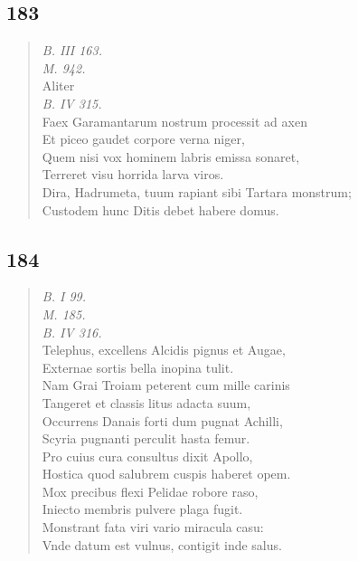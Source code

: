 \documentclass[11pt, a4paper]{report}
\begin{document}
            \subsection*{183}
      \begin{verse}
      \textit{B. III 163.} \\ \textit{M. 942.} \\ Aliter \\ \textit{B. IV 315.} \\ Faex Garamantarum nostrum processit ad axen \\ Et piceo gaudet corpore verna niger, \\ 
        ﻿\pagebreak 
    Quem nisi vox hominem labris emissa sonaret, \\ Terreret visu horrida larva viros. \\ Dira, Hadrumeta, tuum rapiant sibi Tartara monstrum; \\ Custodem hunc Ditis debet habere domus. \\ 
      \end{verse}
  
            \subsection*{184}
      \begin{verse}
      \textit{B. I 99.} \\ \textit{M. 185.} \\ \textit{B. IV 316.} \\ Telephus, excellens Alcidis pignus et Augae, \\ Externae sortis bella inopina tulit. \\ Nam Grai Troiam peterent cum mille carinis \\ Tangeret et classis litus adacta suum, \\ Occurrens Danais forti dum pugnat Achilli, \\ Scyria pugnanti perculit hasta femur. \\ Pro cuius cura consultus dixit Apollo, \\ Hostica quod salubrem cuspis haberet opem. \\ Mox precibus flexi Pelidae robore raso, \\ Iniecto membris pulvere plaga fugit. \\ Monstrant fata viri vario miracula casu: \\ Vnde datum est vulnus, contigit inde salus. \\ 
      \end{verse}
  
\end{document}

